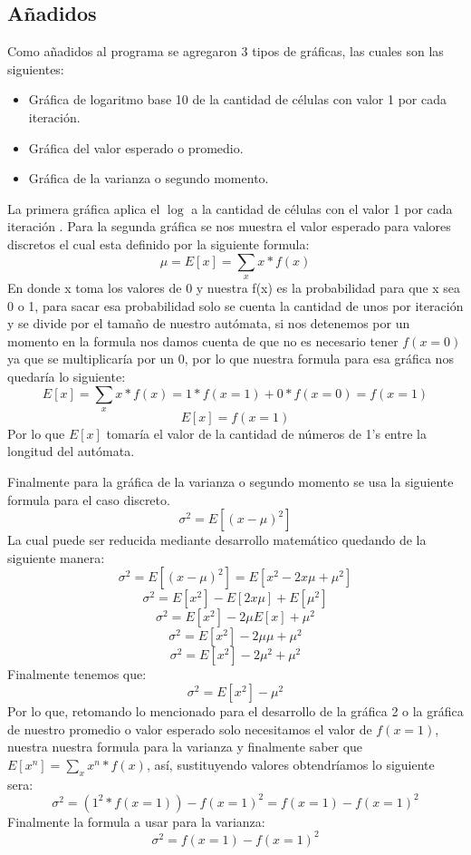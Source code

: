 \documentclass[11pt]{article}
\begin{document}
		\subsection{Añadidos}
		Como añadidos al programa se agregaron 3 tipos de gráficas, las cuales son las siguientes:
		\begin{itemize}
    		\item Gráfica de logaritmo base 10 de la cantidad de células con valor 1 por cada iteración.
		    \item Gráfica del valor esperado o promedio.
		    \item Gráfica de la varianza o segundo momento.
		\end{itemize}\par		
 		La primera gráfica aplica el $\log$ a la cantidad de células con el valor 1 por cada iteración . Para la segunda gráfica se nos muestra el valor esperado para valores discretos el cual esta definido por la siguiente formula:   \[ \mu = E[x] = \sum_{x} x*f(x)\] En donde x toma los valores de 0 y nuestra f(x) es la probabilidad para que x sea 0 o 1, para sacar esa probabilidad solo se cuenta la cantidad de unos por iteración y se divide por el tamaño de nuestro autómata, si nos detenemos por un momento en la formula nos damos cuenta de que no es necesario tener $f(x=0)$ ya que se multiplicaría por un 0, por lo que nuestra formula para esa gráfica nos quedaría lo siguiente: \[ E[x] = \sum_{x} x*f(x) = 1*f(x=1) + 0*f(x=0) = f(x=1)\]	\[ E[x] = f(x=1)\]
 		Por lo que $E[x]$ tomaría el valor de la cantidad de números de 1's entre la longitud del autómata.\par
 		Finalmente para la gráfica de la varianza o segundo momento se usa la siguiente formula para el caso discreto. \[ \sigma^2 =  E[(x-\mu)^2]\] La cual puede ser reducida mediante desarrollo matemático quedando de la siguiente manera: \[ \sigma^2 =  E[(x-\mu)^2] = E[x^2-2x\mu+\mu^2]\]        \[ \sigma^2 = E[x^2]-E[2x\mu]+E[\mu^2]\]	\[ \sigma^2 = E[x^2]-2\mu E[x]+\mu^2\]						\[ \sigma^2 = E[x^2]-2\mu\mu+\mu^2\]	\[ \sigma^2 = E[x^2]-2\mu^2+\mu^2\] Finalmente tenemos que: 	\[ \sigma^2 = E[x^2]-\mu^2\]
 		Por lo que, retomando lo mencionado para el desarrollo de la gráfica 2 o la gráfica de nuestro promedio o valor esperado solo necesitamos el valor de $f(x=1)$, nuestra nuestra formula para la varianza y finalmente saber que $E[x^n] =  \sum_{x} x^n *f(x) $, así, sustituyendo valores obtendríamos lo siguiente sera: \[ \sigma^2 = (1^2*f(x=1)) - f(x=1)^2 = f(x=1) - f(x=1)^2 \] Finalmente la formula a usar para la varianza: \[ \sigma^2 = f(x=1) - f(x=1)^2 \]
\end{document}
